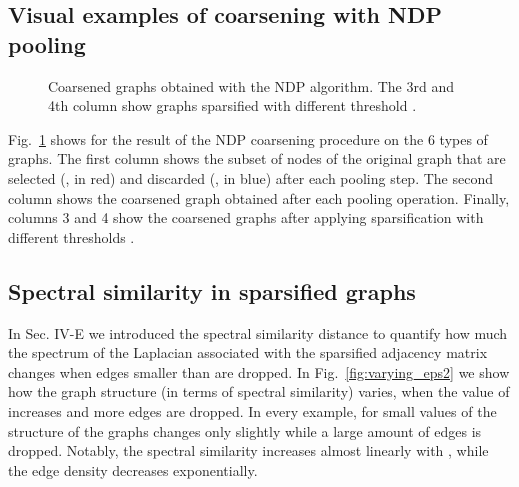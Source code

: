 \documentclass[journal]{IEEEtran}
\begin{document}
\subsection{Visual examples of coarsening with NDP pooling}

\begin{figure}[!pt]
    \centering
    
    
    
    \caption{Coarsened graphs obtained with the NDP algorithm. The 3rd and 4th column show graphs sparsified with different threshold .}
    \label{fig:visualization_grid}
\end{figure}

Fig.~\ref{fig:visualization_grid} shows for the result of the NDP coarsening procedure on the 6 types of graphs.
The first column shows the subset of nodes of the original graph that are selected (, in red) and discarded (, in blue) after each pooling step.
The second column shows the coarsened graph obtained after each pooling operation.
Finally, columns 3 and 4 show the coarsened graphs after applying sparsification with different thresholds .





\subsection{Spectral similarity in sparsified graphs}

In Sec. IV-E we introduced the spectral similarity distance to quantify how much the spectrum of the Laplacian associated with the sparsified adjacency matrix changes when edges smaller than  are dropped.
In Fig.~\ref{fig:varying_eps2} we show how the graph structure (in terms of spectral similarity) varies, when the value of  increases and more edges are dropped.
In every example, for small values of  the structure of the graphs changes only slightly while a large amount of edges is dropped.
Notably, the spectral similarity increases almost linearly with , while the edge density decreases exponentially.
\end{document}
